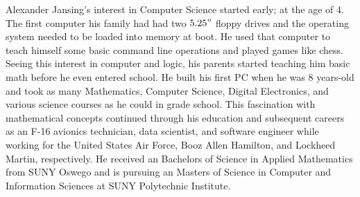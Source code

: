 \begin{vita}

Alexander Jansing's interest in Computer Science started early; at the age of 4. The first computer his family had had two $5.25"$ floppy drives and the operating system needed to be loaded into memory at boot. He used that computer to teach himself some basic command line operations and played games like chess. Seeing this interest in computer and logic, his parents started teaching him basic math before he even entered school. He built his first PC when he was 8 years-old and took as many Mathematics, Computer Science, Digital Electronics, and various science courses as he could in grade school. This fascination with mathematical concepts continued through his education and subsequent careers as an F-16 avionics technician, data scientist, and software engineer while working for the United States Air Force, Booz Allen Hamilton, and Lockheed Martin, respectively. He received an Bachelors of Science in Applied Mathematics from SUNY Oswego and is pursuing an Masters of Science in Computer and Information Sciences at SUNY Polytechnic Institute.
\end{vita}
